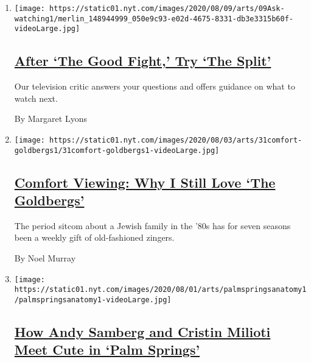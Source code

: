 \begin{enumerate}
\def\labelenumi{\arabic{enumi}.}
\item
  \texttt{[image: https://static01.nyt.com/images/2020/08/09/arts/09Ask-watching1/merlin\_148944999\_050e9c93-e02d-4675-8331-db3e3315b60f-videoLarge.jpg]}

  \hypertarget{after-the-good-fight-try-the-split}{%
  \subsection{\texorpdfstring{\href{/2020/08/04/arts/television/the-good-fight-the-split.html}{After
  `The Good Fight,' Try `The
  Split'}}{After `The Good Fight,' Try `The Split'}}\label{after-the-good-fight-try-the-split}}

  Our television critic answers your questions and offers guidance on
  what to watch next.

  By Margaret Lyons
\item
  \texttt{[image: https://static01.nyt.com/images/2020/08/03/arts/31comfort-goldbergs1/31comfort-goldbergs1-videoLarge.jpg]}

  \hypertarget{comfort-viewing-why-i-still-love-the-goldbergs}{%
  \subsection{\texorpdfstring{\href{/2020/07/31/arts/television/goldbergs-abc-stream.html}{Comfort
  Viewing: Why I Still Love `The
  Goldbergs'}}{Comfort Viewing: Why I Still Love `The Goldbergs'}}\label{comfort-viewing-why-i-still-love-the-goldbergs}}

  The period sitcom about a Jewish family in the '80s has for seven
  seasons been a weekly gift of old-fashioned zingers.

  By Noel Murray
\item
  \texttt{[image: https://static01.nyt.com/images/2020/08/01/arts/palmspringsanatomy1/palmspringsanatomy1-videoLarge.jpg]}

  \hypertarget{how-andy-samberg-and-cristin-milioti-meet-cute-in-palm-springs}{%
  \subsection{\texorpdfstring{\href{/2020/07/31/movies/palm-springs-clip-hulu.html}{How
  Andy Samberg and Cristin Milioti Meet Cute in `Palm
  Springs'}}{How Andy Samberg and Cristin Milioti Meet Cute in `Palm Springs'}}\label{how-andy-samberg-and-cristin-milioti-meet-cute-in-palm-springs}}


\end{enumerate}
